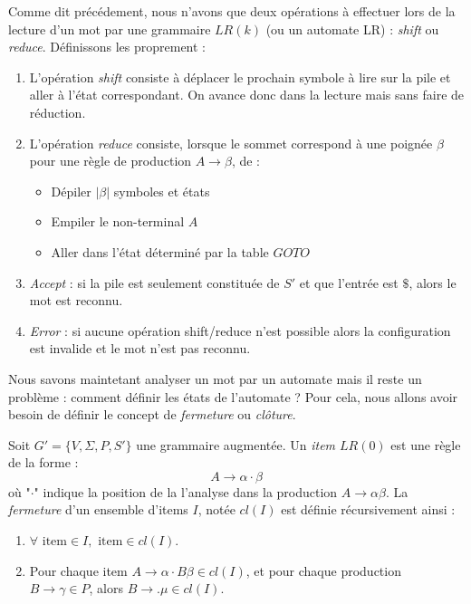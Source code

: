 \begin{definition}
    Comme dit précédement, nous n'avons que deux opérations à effectuer lors de la lecture d'un mot par une grammaire 
    $LR(k)$ (ou un automate LR) : \emph{shift} ou \emph{reduce}. Définissons les proprement : 
    \begin{enumerate}
        \item L'opération \emph{shift} consiste à déplacer le prochain symbole à lire sur la pile et aller 
        à l'état correspondant. On avance donc dans la lecture mais sans faire de réduction. 
        \item L'opération \emph{reduce} consiste, lorsque le sommet correspond à une poignée $ \beta$ pour 
        une règle de production $A \to \beta$, de : 
            \begin{itemize}
                \item Dépiler $ | \beta|$ symboles et états 
                \item Empiler le non-terminal $A$ 
                \item Aller dans l'état déterminé par la table $GOTO$
            \end{itemize}
        \item \emph{Accept} : si la pile est seulement constituée de $S'$ et que l'entrée est $\$$, alors le mot est reconnu. 
        \item \emph{Error} : si aucune opération shift/reduce n'est possible alors la configuration est invalide et le mot n'est pas reconnu. 
    \end{enumerate}
\end{definition}

Nous savons maintetant analyser un mot par un automate mais il reste un problème : comment définir les états 
de l'automate ? Pour cela, nous allons avoir besoin de définir le concept de \emph{fermeture} ou \emph{clôture}.

\begin{definition}[Fermeture]
    Soit $G' = \{V, \Sigma, P, S'\}$ une grammaire augmentée. 
    Un \emph{item $LR(0)$} est une règle de la forme : 
        \[ A \to \alpha \cdot \beta \] 
    où "$\cdot$" indique la position de la l'analyse dans la production $A \to \alpha \beta$. 
    La \emph{fermeture} d'un ensemble d'items $I$, notée $cl(I)$ est définie récursivement ainsi : 
    \begin{enumerate}
        \item $ \forall \text{ item} \in I, \text{ item}  \in cl(I)$. 
        \item Pour chaque item $A \to \alpha \cdot B \beta \in cl(I)$, et pour chaque production $ B \to \gamma \in P$, 
            alors $ B \to . \mu \in cl(I)$. 
    \end{enumerate}
\end{definition}

